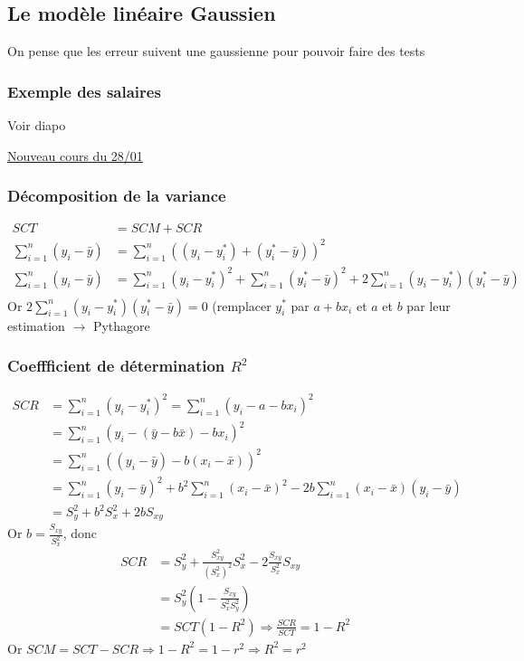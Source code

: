 \documentclass{article}
\theoremstyle{plain}%
\theoremstyle{definition}
\theoremstyle{remark}
\begin{document}
\subsection{Le modèle linéaire Gaussien}
On pense que les erreur suivent une gaussienne pour pouvoir faire des tests 


\subsubsection{Exemple des salaires }
Voir diapo 

\underline{Nouveau cours du 28/01} \\
\subsubsection{Décomposition de la variance}
\begin{align*}
    SCT &= SCM + SCR \\
    \sum_{i=1}^{n}(y_i - \bar{y}) &= \sum_{i=1}^{n}( (y_i - y_i^*) + (y_i^* - \bar{y}) )^2 \\
    \sum_{i=1}^{n}(y_i - \bar{y}) &= \sum_{i=1}^{n}(y_i - y_i^*)^2 + \sum_{i=1}^{n}(y_i^* - \bar{y})^2 + 2 \sum_{i=1}^{n}(y_i - y_i^*)(y_i^* - \bar{y}) \\
\end{align*}
Or $ 2 \sum_{i=1}^{n}(y_i - y_i^*)(y_i^* - \bar{y}) = 0$ (remplacer $ y_i^* $ par $ a+bx_i $ et $ a $ et $ b $ par leur estimation $\rightarrow$ Pythagore

\subsubsection{Coeffficient de détermination $ R^2 $ }
\begin{align*}
    SCR &= \sum_{i=1}^{n}(y_i - y_i^*)^2 = \sum_{i=1}^{n}(y_i - a- bx_i)^2 \\
        &= \sum_{i=1}^{n}(y_i - ( \bar{y} - b \bar{x}) - bx_i)^2 \\
        &= \sum_{i=1}^{n}( (y_i - \bar{y}) - b (x_i - \bar{x}))^2 \\
        &= \sum_{i=1}^{n}(y_i - \bar{y})^2 + b^2 \sum_{i=1}^{n}(x_i - \bar{x})^2 - 2b \sum_{i=1}^{n}(x_i - \bar{x})(y_i - \bar{y})\\
        &= S_y^2 + b^2 S_x^2 + 2b S_{xy}
\end{align*}
Or $ b = \frac{S_{xy}}{S_x^2} $, donc 
\begin{align*}
    SCR &= S_y^2 + \frac{S_{xy}^2}{(S_x^2)^2} S_x^2 - 2 \frac{S_{xy}}{S_x^2} S_{xy}\\
        &= S_y^2 (1 - \frac{S_{xy}}{S_x^2 S_y^2}) \\
        &= SCT ( 1 - R^2) \Rightarrow \frac{SCR}{SCT} = 1 - R^2
\end{align*} 
Or $SCM = SCT - SCR \Rightarrow 1 - R^2 = 1-r^2 \Rightarrow R^2 = r^2$
\end{document}
